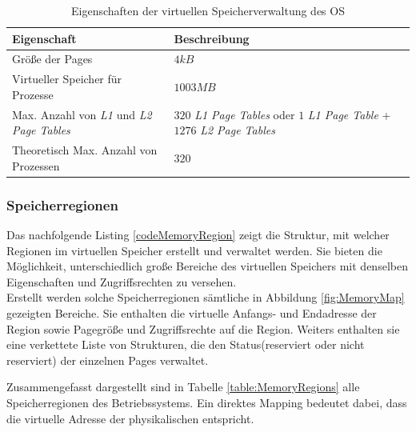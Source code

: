 \begin{table}[H]
\begin{tabular}{p{7cm} | p{7cm}}
  \textbf{Eigenschaft} & \textbf{Beschreibung} \\ \hline
  Größe der Pages & $4kB$\\
  Virtueller Speicher für Prozesse & $1003MB$\\
  Max. Anzahl von \textit{L1} und \textit{L2 Page Tables} & $320$ \textit{L1 Page Tables} oder $1$ \textit{L1 Page Table} + $1276$ \textit{L2 Page Tables}\\
  Theoretisch Max. Anzahl von Prozessen & $320$\\
 \end{tabular}
 \caption{Eigenschaften der virtuellen Speicherverwaltung des OS}
 \label{table:SpecifiedVirtualMemory}
\end{table}

\subsubsection{Speicherregionen}

Das nachfolgende Listing \ref{codeMemoryRegion} zeigt die Struktur, mit welcher Regionen im virtuellen Speicher erstellt und verwaltet werden. Sie bieten die Möglichkeit, unterschiedlich große Bereiche des virtuellen Speichers mit denselben Eigenschaften und Zugriffsrechten zu versehen.\\

Erstellt werden solche Speicherregionen sämtliche in Abbildung \ref{fig:MemoryMap} gezeigten Bereiche. Sie enthalten die virtuelle Anfangs- und Endadresse der Region sowie Pagegröße und Zugriffsrechte auf die Region. Weiters enthalten sie eine verkettete Liste von Strukturen, die den Status(reserviert oder nicht reserviert) der einzelnen Pages verwaltet.\\


\vspace{0.5cm}

Zusammengefasst dargestellt sind in Tabelle \ref{table:MemoryRegions} alle Speicherregionen des Betriebssystems. Ein direktes Mapping bedeutet dabei, dass die virtuelle Adresse der physikalischen entspricht.\\


